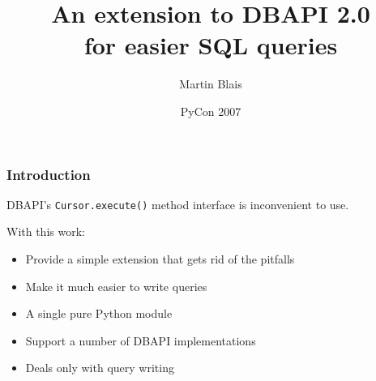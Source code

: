 \documentclass{beamer}
\title{An extension to DBAPI 2.0 \\
for easier SQL queries}
\subtitle{}
\author{Martin Blais}
\institute{}
\date{PyCon 2007}
\begin{document}
\begin{frame}
  \titlepage
\end{frame}



\begin{frame}[fragile]
  \frametitle{Introduction}

  DBAPI's \texttt{Cursor.execute()} method interface is inconvenient to use.

\vfill
  With this work:
  \begin{itemize}
  \item Provide a simple extension that gets rid of the pitfalls
  \item Make it much easier to write queries
  \item A single pure Python module
  \item Support a number of DBAPI implementations
  \item Deals only with query writing
  \end{itemize}

\end{frame}



\end{document}
